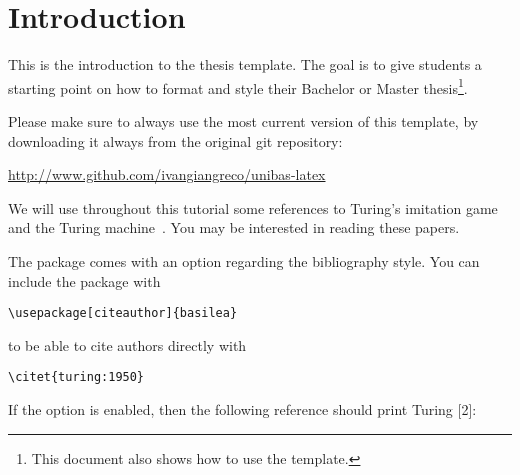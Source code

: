 \chapter{Introduction}

This is the introduction to the thesis template. The goal is to give students a starting point on how to format and style their Bachelor or Master thesis\footnote{This document also shows how to use the template.}. 

Please make sure to always use the most current version of this template, by downloading it always from the original git repository:
\begin{center}
	\url{http://www.github.com/ivangiangreco/unibas-latex} 
\end{center}

We will use throughout this tutorial some references to Turing's imitation game~\cite{turing:1950} and the Turing machine~\cite{turing:1936}. You may be interested in reading these papers.

\vspace{1em}
The package comes with an option regarding the bibliography style.
You can include the package with
\begin{verbatim}
\usepackage[citeauthor]{basilea}
\end{verbatim}
to be able to cite authors directly with
\begin{verbatim}
\citet{turing:1950}
\end{verbatim}

If the option is enabled, then the following reference should print Turing [2]:~\citet{turing:1950}

